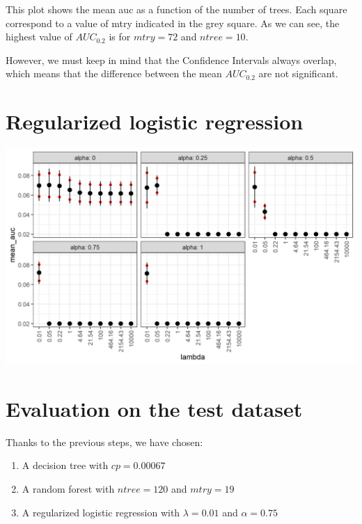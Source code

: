 \documentclass[
  12pt,
  oneside]{report}
\begin{document}
This plot shows the mean auc as a function of the number of trees. Each square correspond to a value of mtry indicated in the grey square. As we can see, the highest value of \(AUC_{0.2}\) is for \(mtry = 72\) and \(ntree = 10\).

However, we must keep in mind that the Confidence Intervals always overlap, which means that the difference between the mean \(AUC_{0.2}\) are not significant.

\hypertarget{regularized-logistic-regression}{%
\section{Regularized logistic regression}\label{regularized-logistic-regression}}

\includegraphics[width=30.38in]{data/cv_lr}

\hypertarget{evaluation-on-the-test-dataset}{%
\section{Evaluation on the test dataset}\label{evaluation-on-the-test-dataset}}

Thanks to the previous steps, we have chosen:

\begin{enumerate}
\def\labelenumi{\arabic{enumi}.}
\item
  A decision tree with \(cp = 0.00067\)
\item
  A random forest with \(ntree = 120\) and \(mtry = 19\)
\item
  A regularized logistic regression with \(\lambda = 0.01\) and \(\alpha = 0.75\)
\end{enumerate}
\end{document}
